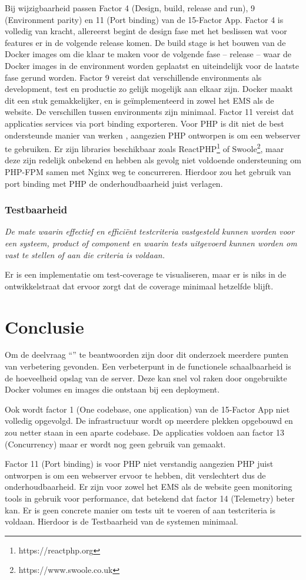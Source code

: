 Bij wijzigbaarheid passen Factor 4 (Design, build, release and run), 9 (Environment parity) en 11 (Port binding) van de 15-Factor App. Factor 4 is volledig van kracht, allereerst begint de design fase met het beslissen wat voor features er in de volgende release komen. De build stage is het bouwen van de Docker images om die klaar te maken voor de volgende fase -- release -- waar de Docker images in de environment worden geplaatst en uiteindelijk voor de laatste fase gerund worden. Factor 9 vereist dat verschillende environments als development, test en productie zo gelijk mogelijk aan elkaar zijn. Docker maakt dit een stuk gemakkelijker, en is geïmplementeerd in zowel het EMS als de website. De verschillen tussen environments zijn minimaal. Factor 11 vereist dat applicaties services via port binding exporteren. Voor PHP is dit niet de best ondersteunde manier van werken \parencite{PortBinding1, PortBinding2, PortBinding3}, aangezien PHP ontworpen is om een webserver te gebruiken. Er zijn libraries beschikbaar zoals ReactPHP\footnote{https://reactphp.org} of Swoole\footnote{https://www.swoole.co.uk}, maar deze zijn redelijk onbekend en hebben als gevolg niet voldoende ondersteuning om PHP-FPM samen met Nginx weg te concurreren. Hierdoor zou het gebruik van port binding met PHP de onderhoudbaarheid juist verlagen.

\subsubsection{Testbaarheid}
\textit{De mate waarin effectief en efficiënt testcriteria vastgesteld kunnen worden voor een systeem, product of component en waarin tests uitgevoerd kunnen worden om vast te stellen of aan die criteria is voldaan.}

Er is een implementatie om test-coverage te visualiseren, maar er is niks in de ontwikkelstraat dat ervoor zorgt dat de coverage minimaal hetzelfde blijft. 

\section{Conclusie}
Om de deelvraag \enquote{\deelhuidig} te beantwoorden zijn door dit onderzoek meerdere punten van verbetering gevonden. Een verbeterpunt in de functionele schaalbaarheid is de hoeveelheid opslag van de server. Deze kan snel vol raken door ongebruikte Docker volumes en images die ontstaan bij een deployment. 

Ook wordt factor 1 (One codebase, one application) van de 15-Factor App niet volledig opgevolgd. De infrastructuur wordt op meerdere plekken opgebouwd en zou netter staan in een aparte codebase. De applicaties voldoen aan factor 13 (Concurrency) maar er wordt nog geen gebruik van gemaakt. 

Factor 11 (Port binding) is voor PHP niet verstandig aangezien PHP juist ontworpen is om een webserver ervoor te hebben, dit verslechtert dus de onderhoudbaarheid. Er zijn voor zowel het EMS als de website geen monitoring tools in gebruik voor performance, dat betekend dat factor 14 (Telemetry) beter kan. Er is geen concrete manier om tests uit te voeren of aan testcriteria is voldaan. Hierdoor is de Testbaarheid van de systemen minimaal.